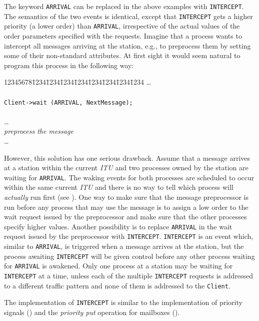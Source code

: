 The keyword {\tt ARRIVAL} can be replaced in the above examples with
{\tt INTERCEPT}.
The semantics of the two events is identical, except that {\tt INTERCEPT}
gets a higher priority (a lower order) than {\tt ARRIVAL}, irrespective of
the actual values of the order parameters specified with the requests.
Imagine that a process wants to intercept all messages
arriving at the station, e.g.,
to preprocess them by setting some of their non-standard attributes.
At first sight it would seem natural to program
this process in the following way:
{\tt\begin{tabbing}
12345678\=1234\=1234\=1234\=1234\=1234\=1234\=1234\=1234\kill
\>\ldots \\
 \\
\> \> {\tt Client->wait (ARRIVAL, NextMessage);} \\
 \\
\> \>\ldots \\
\> \> {\em preprocess the message} \\
\>\ldots
\end{tabbing}}
However, this solution has one serious drawback.
Assume that a message arrives at a station
within the current {\em ITU\/} and two
processes owned by the station are waiting for
{\tt ARRIVAL}.
The waking events for both processes are scheduled to occur within the same
current {\em ITU\/} and there is no way to tell which process will
{\em actually\/} run first (see ).
One way to make sure that the message preprocessor is run before any
process that may use the message is to assign a low order to the wait
request issued by the preprocessor and make sure that the other
processes specify higher values.
Another possibility is to replace {\tt ARRIVAL} in the
wait request issued by the preprocessor with {\tt INTERCEPT}.
{\tt INTERCEPT} is an event which, similar to {\tt ARRIVAL}, is triggered
when a message arrives at the station, but the process
awaiting {\tt INTERCEPT}
will be given control before any other process waiting for {\tt ARRIVAL}
is awakened.
Only one process at a station may be waiting for {\tt INTERCEPT} at a time,
unless each of the multiple {\tt INTERCEPT} requests is addressed to
a different traffic pattern and none of them is addressed to the {\tt Client}.

The implementation of {\tt INTERCEPT} is similar to the implementation
of priority signals () and the
{\em priority put\/} operation for mailboxes ().

